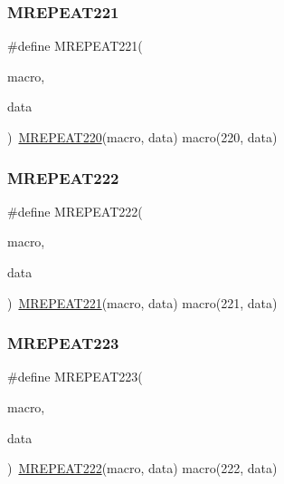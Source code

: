 \mbox{\label{group__group__sam0__utils__mrepeat_ga8b900659b10dcbf3db345acef26f242c}} 
\subsubsection{\texorpdfstring{MREPEAT221}{MREPEAT221}}
{\footnotesize\ttfamily \#define M\+R\+E\+P\+E\+A\+T221(\begin{DoxyParamCaption}\item[{}]{macro,  }\item[{}]{data }\end{DoxyParamCaption})~\mbox{\hyperlink{group__group__sam0__utils__mrepeat_ga87b159389edf9a6b6f2e0fcf17139964}{M\+R\+E\+P\+E\+A\+T220}}(macro, data)   macro(220, data)}

\mbox{\label{group__group__sam0__utils__mrepeat_ga8a7acdd582f6480ff0ba12258858670f}} 
\subsubsection{\texorpdfstring{MREPEAT222}{MREPEAT222}}
{\footnotesize\ttfamily \#define M\+R\+E\+P\+E\+A\+T222(\begin{DoxyParamCaption}\item[{}]{macro,  }\item[{}]{data }\end{DoxyParamCaption})~\mbox{\hyperlink{group__group__sam0__utils__mrepeat_ga8b900659b10dcbf3db345acef26f242c}{M\+R\+E\+P\+E\+A\+T221}}(macro, data)   macro(221, data)}

\mbox{\label{group__group__sam0__utils__mrepeat_ga6d10ab8a91d39e5445dd73345376b1c0}} 
\subsubsection{\texorpdfstring{MREPEAT223}{MREPEAT223}}
{\footnotesize\ttfamily \#define M\+R\+E\+P\+E\+A\+T223(\begin{DoxyParamCaption}\item[{}]{macro,  }\item[{}]{data }\end{DoxyParamCaption})~\mbox{\hyperlink{group__group__sam0__utils__mrepeat_ga8a7acdd582f6480ff0ba12258858670f}{M\+R\+E\+P\+E\+A\+T222}}(macro, data)   macro(222, data)}

